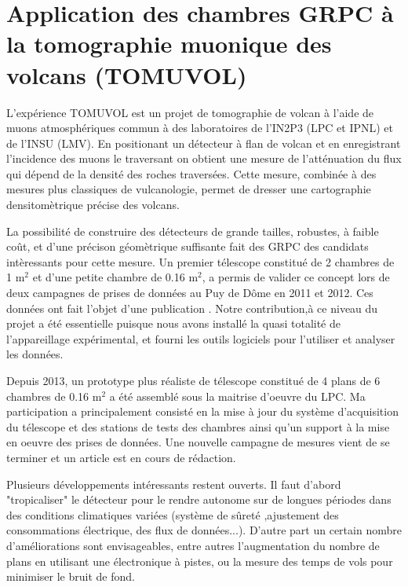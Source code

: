 \documentclass[11pt,french]{article}
\begin{document}
\section*{ Application des chambres GRPC \`a la tomographie muonique des volcans (TOMUVOL)}

L'exp\'erience TOMUVOL est un projet  de tomographie de volcan \`a l'aide de muons atmosph\'eriques commun \`a des laboratoires de l'IN2P3 (LPC et IPNL) et de l'INSU (LMV). En positionant un d\'etecteur \`a flan de volcan et en enregistrant l'incidence des muons le traversant on obtient une mesure de  l'att\'enuation du flux qui d\'epend  de la densit\'e des roches travers\'ees. Cette mesure, combin\'ee \`a des mesures plus classiques de vulcanologie, permet de dresser une cartographie densitom\`etrique pr\'ecise des volcans.

La possibilit\'e de construire des d\'etecteurs de grande tailles, robustes, \`a faible co\^ut, et d'une pr\'ecison g\'eom\`etrique suffisante fait des GRPC des candidats int\`eressants pour cette mesure. Un premier t\'elescope constitu\'e de 2 chambres de 1 m$^2$ et d'une petite chambre de 0.16 m$^2$, a permis de valider ce concept lors de deux campagnes de prises de donn\'ees au Puy de D\^ome en 2011 et 2012. Ces donn\'ees ont fait l'objet d'une publication \cite{gid}.  Notre contribution,\`a ce niveau du projet a \'et\'e essentielle puisque nous avons install\'e la quasi totalit\'e  de l'appareillage exp\'erimental, et fourni les outils logiciels pour l'utiliser et analyser les donn\'ees.

Depuis 2013, un prototype plus r\'ealiste de t\'elescope constitu\'e de 4 plans de 6 chambres de 0.16 m$^2$ a \'et\'e assembl\'e sous la maitrise d'oeuvre du LPC. Ma participation a principalement consist\'e en la mise \`a jour du syst\`eme d'acquisition du t\'elescope et des stations de tests des chambres ainsi qu'un support \`a la mise en oeuvre des prises de donn\'ees. Une nouvelle campagne de mesures vient de se terminer et un article est en cours de r\'edaction.

Plusieurs d\'eveloppements int\'eressants restent ouverts. Il faut d'abord "tropicaliser" le d\'etecteur pour le rendre autonome sur de longues p\'eriodes dans des conditions climatiques vari\'ees (syst\`eme de s\^uret\'e ,ajustement des consommations \'electrique, des flux de donn\'ees...). D'autre part un certain nombre d'am\'eliorations sont envisageables, entre autres l'augmentation du nombre de plans en utilisant une \'electronique \`a pistes, ou la mesure des temps de vols pour minimiser le bruit de fond.      
\end{document}
